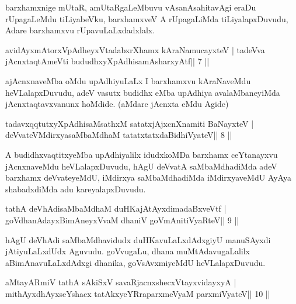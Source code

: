 \begin{artha}
barxhamxnige mUtaR, amUtaRgaLeMbuvu vAsanAsahitavAgi eraDu rUpagaLeMdu tiLiyabeVku, barxhamxveV A rUpagaLiMda tiLiyalapxDuvudu, Adare barxhamxvu rUpavuLaLxdadxlalx.
\end{artha}



\begin{shl}
avidAyxmAtorxVpAdheyxVtadabxrXhamx kAraNamucayxteV |
tadeVva jAcnxtaqtAmeVti bududhxyXpAdhisamAsharxyAtf\hfill || 7 ||
\end{shl}

\begin{artha}
ajAcnxnaveMba oMdu upAdhiyuLaLx I barxhamxvu kAraNaveMdu
heVLalapxDuvudu, adeV vasutx budidhx eMba upAdhiya avalaMbaneyiMda
jAcnxtaqtavxvanunx hoMdide. (aMdare jAcnxta eMdu Agide)
\end{artha}



\begin{shl}
tadavxqqtutxyXpAdhisaMsathxM satatxjAjxcnXnamiti BaNayxteV |
deVvateVMdirxyasaMbaMdhaM tatatxtatxdaBidhiVyateV\hfill || 8 ||
\end{shl}

\begin{artha}
A budidhxvaqtitxyeMba upAdhiyalilx idudxkoMDa barxhamx ceYtanayxvu jAcnxnaveMdu heVLalapxDuvudu, hAgU deVvatA saMbaMdhadiMda adeV barxhamx deVvateyeMdU, iMdirxya saMbaMdhadiMda iMdirxyaveMdU AyAya shabadxdiMda adu kareyalapxDuvudu.
\end{artha}



\begin{shl}
tathA deVhAdisaMbaMdhaM duHKajAtAyxdimadaBxveVtf |
goVdhanAdayxBimAneyxVvaM dhaniV goVmAnitiVyaRteV\hfill || 9 ||
\end{shl}

\begin{artha}
hAgU deVhAdi saMbaMdhavidudx duHKavuLaLxdAdxgiyU
manuSAyxdi jAtiyuLaLxdUdx Aguvudu. goVvugaLu, dhana muMtAdavugaLalilx
aBimAnavuLaLxdAdxgi dhanika, goVsAvxmiyeMdU heVLalapxDuvudu.
\end{artha}



\begin{shl}
aMtayARmiV tathA sAkiSxV savaRjacnxshecxVtayxvidayxyA |
mithAyxdhAyxseYshacx tatAkxyeYRraparxmeVyaM parxmiVyateV\hfill || 10 ||
\end{shl}

